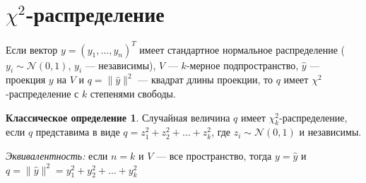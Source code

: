 \documentclass[12pt]{article} %
\theoremstyle{definition} %
\def \hy{\hat{y}}
\def \cN{\mathcal{N}}
\begin{document}
\section{$\chi^2$-распределение}

\begin{define}\label{d1}
    Если вектор $y = (y_1, \hdots, y_n)^T$ имеет стандартное нормальное распределение ( $y_i \sim \cN(0, 1)$, $y_i$ — независимы), $V$ — $k$-мерное подпространство, $\hy$ — проекция $y$ на $V$ и $q = \lVert \hy \rVert^2$ — квадрат длины проекции, то $q$ имеет $\chi^2$-распределение с $k$ степенями свободы.
\end{define}

\newtheorem*{classic_def}{Классическое определение}
\begin{classic_def}\label{cd1}
    Случайная величина $q$ имеет $\chi_k^2$-распределение, если $q$ представима в виде $q = z_1^2 + z_2^2 + \hdots + z_k^2$, где $z_i \sim \cN(0, 1)$ и независимы.
\end{classic_def}
\smallskip
\emph{Эквивалентность:} если $n=k$ и $V$ — все пространство, тогда $y = \hy$ и $q = \lVert \hy \rVert ^2 = y_1^2 + y_2^2 + \hdots + y_k^2$ \par
\smallskip
\newtheorem*{exerc}{Упражнение}
\end{document}
